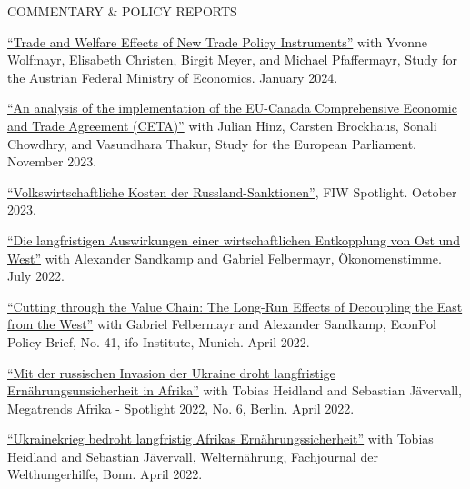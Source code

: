 \documentclass{article}
\begin{document}
\begin{minipage}[t]{0.12\textwidth}
    {\selectfont COMMENTARY \& POLICY REPORTS} \\
\end{minipage}
\hspace{5mm}
\begin{minipage}[t]{0.8\textwidth}
    \href{https://www.fiw.ac.at/publications/trade-and-welfare-effects-of-new-trade-policy-instruments/}{``Trade and Welfare Effects of New Trade Policy Instruments''} with Yvonne Wolfmayr, Elisabeth Christen, Birgit Meyer, and Michael Pfaffermayr, Study for the Austrian Federal Ministry of Economics. January 2024.\par
    \href{https://www.europarl.europa.eu/RegData/etudes/IDAN/2023/754440/EXPO_IDA(2023)754440_EN.pdf}{``An analysis of the implementation of the EU-Canada Comprehensive Economic and Trade Agreement (CETA)''} with Julian Hinz, Carsten Brockhaus, Sonali Chowdhry, and Vasundhara Thakur, Study for the European Parliament. November 2023. \par
    \href{https://www.fiw.ac.at/2023/10/02/volkswirtschaftliche-kosten-der-russland-sanktionen/}{``Volkswirtschaftliche Kosten der Russland-Sanktionen''}, FIW Spotlight. October 2023. \par
    \href{https://www.oekonomenstimme.org/artikel/2022/07/die-langfristigen-auswirkungen-einer-wirtschaftlichen-entkopplung-von-ost-und-west/}{``Die langfristigen Auswirkungen einer wirtschaftlichen Entkopplung von Ost und West''} with Alexander Sandkamp and Gabriel Felbermayr, Ökonomenstimme. July 2022. \par
    \href{https://www.cesifo.org/en/publikationen/2022/working-paper/cutting-through-value-chain-long-run-effects-decoupling-east-west}{``Cutting through the Value Chain: The Long-Run Effects of Decoupling the East from the West''} with Gabriel Felbermayr and Alexander Sandkamp, EconPol Policy Brief, No. 41, ifo Institute, Munich. April 2022. \par
    \href{https://www.megatrends-afrika.de/publikation/mit-der-russischen-invasion-der-ukraine-droht-langfristige-ernaehrungsunsicherheit-in-afrika}{``Mit der russischen Invasion der Ukraine droht langfristige Ernährungsunsicherheit in Afrika''} with Tobias Heidland and Sebastian Jävervall, Megatrends Afrika - Spotlight 2022, No. 6, Berlin. April 2022. \par
    \href{https://www.welthungerhilfe.de/welternaehrung/rubriken/agrar-ernaehrungspolitik/wie-der-ukrainekrieg-afrikas-brotversorgung-trifft/}{``Ukrainekrieg bedroht langfristig Afrikas Ernährungssicherheit''} with Tobias Heidland and Sebastian Jävervall, Welternährung, Fachjournal der Welthungerhilfe, Bonn. April 2022. \par

\end{minipage}
\end{document}

